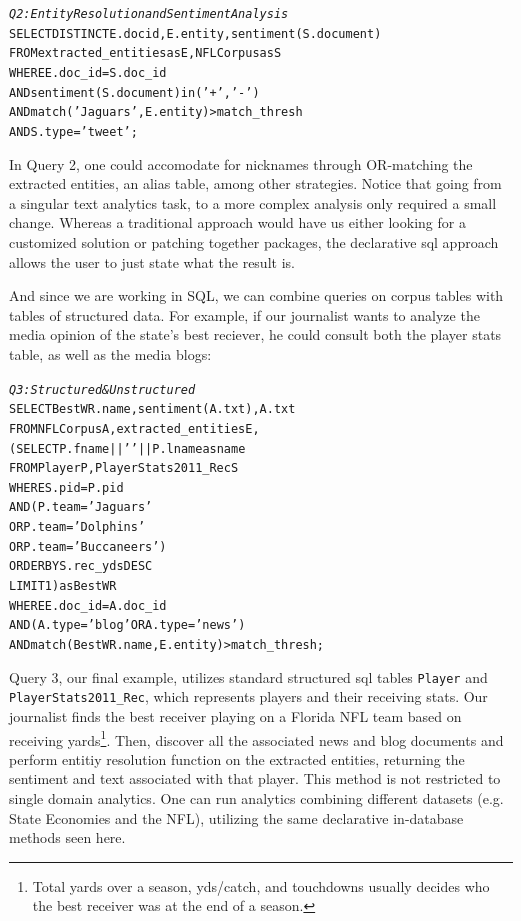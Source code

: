 \begin{small}
\begin{alltt}
\textit{Q2: Entity Resolution and Sentiment Analysis}
SELECT DISTINCT E.docid, E.entity, sentiment(S.document)
FROM extracted_entities as E, NFLCorpus as S
WHERE E.doc_id = S.doc_id
  AND sentiment(S.document) in ('+', '-')
  AND match('Jaguars', E.entity) > match\_thresh
  AND S.type = 'tweet';
\end{alltt}
\end{small}

In Query 2, one could accomodate for nicknames through OR-matching
the extracted entities, an alias table, among other strategies. Notice
that going from a singular text analytics task, to a more 
complex analysis only required a small change. Whereas a traditional
approach would have us either looking for a customized solution or patching
together packages, the declarative sql approach allows the user to just 
state what the result is.

And since we are working in SQL, we can combine queries on corpus 
tables with tables of structured data. For example, if our journalist
wants to analyze the media opinion of the state's best reciever,
he could consult both the player stats table, as well as the media blogs:

\begin{small}
\begin{alltt}
\textit{Q3: Structured & Unstructured}
SELECT BestWR.name, sentiment(A.txt), A.txt
FROM NFLCorpus A, extracted_entities E,
         (SELECT P.fname || ' ' || P.lname as name
          FROM Player P, PlayerStats2011_Rec S
          WHERE S.pid = P.pid
            AND (   P.team = 'Jaguars' 
                 OR P.team = 'Dolphins' 
                 OR P.team = 'Buccaneers')
          ORDER BY S.rec_yds DESC
          LIMIT 1) as BestWR
WHERE E.doc_id = A.doc_id 
  AND (A.type = 'blog' OR A.type = 'news')
  AND match(BestWR.name, E.entity) > match\_thresh;
\end{alltt}
\end{small}

Query 3, our final example, utilizes standard structured sql tables {\tt Player}
and {\tt PlayerStats2011\_Rec}, which represents players and their receiving
stats. Our journalist finds the best receiver playing on a Florida NFL team
based on receiving yards\footnote{Total yards over a season, yds/catch, and
touchdowns usually decides who the best receiver was at the end of a season.}.
Then, discover all the associated news and blog documents and perform entitiy
resolution function on the extracted entities, returning the sentiment and text
associated with that player. This method is not restricted to single domain
analytics. One can run analytics combining different datasets (e.g. State
Economies and the NFL), utilizing the same declarative in-database methods seen
here.

